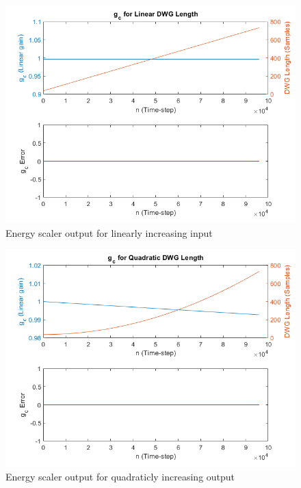 \documentclass[../main.tex]{subfiles}
\begin{document}
\begin{figure}[h!]
    \centering
    \includegraphics[scale=.50]{./images/plots/EnergyScalerLinearIncreasing.png}
    \caption{Energy scaler output for linearly increasing input}
    \label{fig:EnergyScalerLinInc}
\end{figure}

\begin{figure}[h!]
    \centering
    \includegraphics[scale=.50]{./images/plots/EnergyScalerQuadraticIncreasing.png}
    \caption{Energy scaler output for quadraticly increasing output}
    \label{fig:EnergyScalerQuadInc}
\end{figure}

\clearpage
\end{document}

